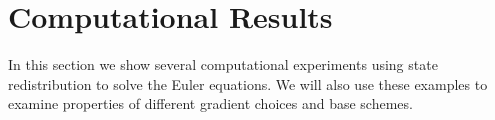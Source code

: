 \section{Computational Results}\label{sec:compResults}

In this section we show several computational experiments using state
redistribution to solve the Euler
equations. We will also use these
examples to examine 
properties of different gradient choices and base schemes. 

%
